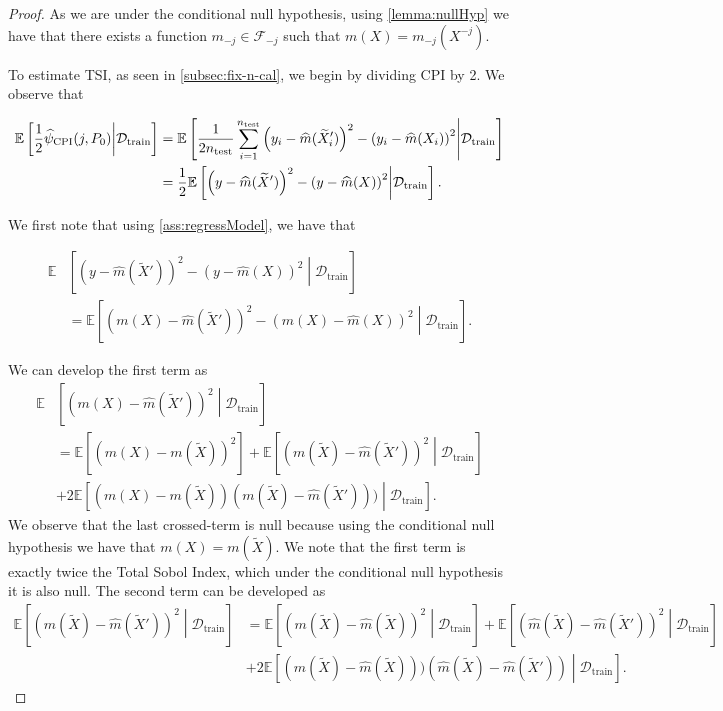 \documentclass{article}
\theoremstyle{plain}
\theoremstyle{definition}
\theoremstyle{remark}
\newcommand{\e}[1]{\mathbb{E}\left[#1\right]  } %
\begin{document}
\begin{proof}

    
    As we are under the conditional null hypothesis, using \cref{lemma:nullHyp} we have that there exists a function $m_{-j}\in \mathcal{F}_{-j}$ such that  $m(X)=m_{-j}(X^{-j})$. 
    
    To estimate TSI, as seen in \cref{subsec:fix-n-cal}, we begin by dividing CPI by 2.
    We observe that 
    
    \begin{align}
         \notag\e{\frac{1}{2}\widehat{\psi}_\mathrm{CPI}(j, P_0)\middle|\mathcal{D}_\mathrm{train}}&= 
         \e{\frac{1}{2n_\mathrm{test}}\sum_{i=1}^{n_\mathrm{test}}\left(y_i-\widehat{m}(\widetilde{X}'_i)\right)^2-\left(y_i-\widehat{m}(X_i)\right)^2\middle|\mathcal{D}_\mathrm{train}}\\
         &=\frac{1}{2}\e{\left(y-\widehat{m}(\widetilde{X}')\right)^2-\left(y-\widehat{m}(X)\right)^2\middle|\mathcal{D}_\mathrm{train}}.\label{eq:bias-cpi1}
     \end{align}
     
    
    We first note that using \cref{ass:regressModel}, we have that


    \begin{align*}
        \mathbb{E}&\left[\left(y-\widehat{m}(\widetilde{X}')\right)^2-\left(y-\widehat{m}(X)\right)^2\middle|\mathcal{D}_\mathrm{train} \right]\\&=\e{\left(m(X)-\widehat{m}(\widetilde{X}')\right)^2-\left(m(X)-\widehat{m}(X)\right)^2\middle|\mathcal{D}_\mathrm{train}}.
    \end{align*}
    
     We can develop the first term as 
    \begin{align*}
        \mathbb{E}&\left[\left(m(X)-\widehat{m}(\widetilde{X}')\right)^2\middle|\mathcal{D}_\mathrm{train}\right]\\&= \e{\left(m(X)-m(\widetilde{X})\right)^2} + \e{\left(m(\widetilde{X})-\widehat{m}(\widetilde{X}')\right)^2\middle|\mathcal{D}_\mathrm{train}}\\&+2\e{(m(X)-m(\widetilde{X}))(m(\widetilde{X})-\widehat{m}(\widetilde{X}')))\middle|\mathcal{D}_\mathrm{train}}.
    \end{align*}
    We observe that the last crossed-term is null because using the conditional null hypothesis we have that $m(X)=m(\widetilde{X})$. 
    We note that the first term is exactly twice the Total Sobol Index, which under the conditional null hypothesis it is also null. The second term can be developed as
    \begin{align*}
        \mathbb{E}\left[\left(m(\widetilde{X})-\widehat{m}(\widetilde{X}')\right)^2\middle|\mathcal{D}_\mathrm{train}\right]&=\e{(m(\widetilde{X})-\widehat{m}(\widetilde{X}))^2\middle|\mathcal{D}_\mathrm{train}}+\e{(\widehat{m}(\widetilde{X})-\widehat{m}(\widetilde{X}'))^2\middle|\mathcal{D}_\mathrm{train}}\\&+2\e{(m(\widetilde{X})-\widehat{m}(\widetilde{X})))(\widehat{m}(\widetilde{X})-\widehat{m}(\widetilde{X}'))\middle|\mathcal{D}_\mathrm{train}}.
    \end{align*}
    

\end{proof}
\end{document}
